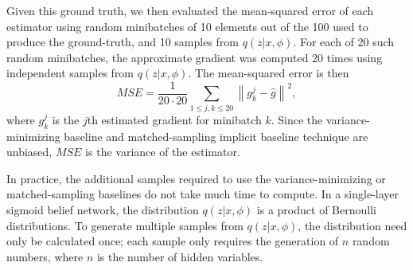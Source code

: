 \documentclass{article} %
\begin{document}
Given this ground truth, we then evaluated the mean-squared error of each estimator using random minibatches of 10 elements out of the 100 used to produce the ground-truth, and 10 samples from $q(z|x, \phi)$.  For each of 20 such random minibatches, the approximate gradient was computed 20 times using independent samples from $q(z|x, \phi)$.  The mean-squared error is then
\begin{equation*}
MSE = \frac{1}{20 \cdot 20} \sum_{1 \leq j,k \leq 20} \left\|g_k^j - \hat{g} \right\|^2, 
\end{equation*}
where $g_k^j$ is the $j$th estimated gradient for minibatch $k$.  Since the variance-minimizing baseline and matched-sampling implicit baseline technique are unbiased, $MSE$ is the variance of the estimator.  %

\begin{comment}
(3) MSE for each baseline technique
  (a) Compute the gradient estimate $g_k^j$ using randomly select 10 inputs out of the 100 inputs $\{x_1, x_2, .., x_{10}\}$ and 10 samples from $q(z|x)$ for each $x_t$
  (b) Repeat (a) for 20 times with the fixed input set to get $\{g_k^1, .., g_k^{20}\}$
  (c) Repeat (a-b) for 20 times to get $\{ g_1^1, g_1^2, .., g_{20}^{20}\}$
  (d) Compute the squared error $\text{SE}_k^j = \| g_k^j - \hat{g} \|_2^2$ for all $k=1,..,20$ and $j=1,..,20$
  (e) The final MSE is $\text{MSE} = \frac{1}{20*20} \sum_{k,j=1}^{20} \text{SE}_k^j,$ and below I also report the standard deviation of the squared errors.
\end{comment}




In practice, the additional samples required to use the variance-minimizing or matched-sampling baselines do not take much time to compute.  In a single-layer sigmoid belief network, the distribution $q(z|x, \phi)$ is a product of Bernoulli distributions.  To generate multiple samples from $q(z|x, \phi)$, the distribution need only be calculated once; each sample only requires the generation of $n$ random numbers, where $n$ is the number of hidden variables.  
\end{document}
